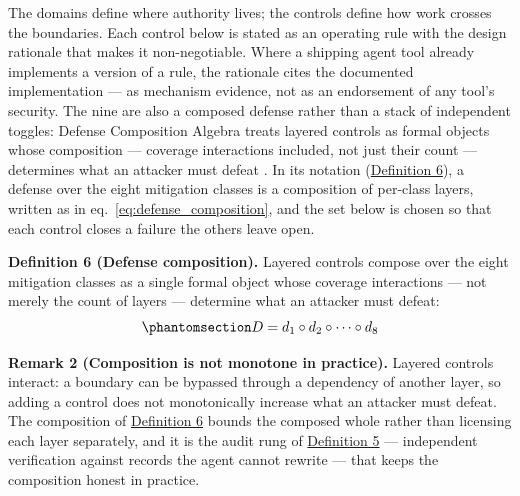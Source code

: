 \documentclass[
  english,
  9pt,
]{extarticle}
\begin{document}
The domains define where authority lives; the controls define how work
crosses the boundaries. Each control below is stated as an operating
rule with the design rationale that makes it non-negotiable. Where a
shipping agent tool already implements a version of a rule, the
rationale cites the documented implementation --- as mechanism evidence,
not as an endorsement of any tool's security. The nine are also a
composed defense rather than a stack of independent toggles: Defense
Composition Algebra treats layered controls as formal objects whose
composition --- coverage interactions included, not just their count ---
determines what an attacker must defeat \citep{cif_formal_2026}. In its
notation (\hyperref[def:defense_composition]{Definition 6}), a defense
over the eight mitigation classes is a composition of per-class layers,
written as in eq.~\ref{eq:defense_composition}, and the set below is
chosen so that each control closes a failure the others leave open.

\protect{}\label{def:defense_composition}
\textbf{Definition 6 (Defense composition).} Layered controls compose
over the eight mitigation classes as a single formal object whose
coverage interactions --- not merely the count of layers --- determine
what an attacker must defeat:
\begin{equation}\protect\phantomsection\label{eq:defense_composition}{D = d_1 \circ d_2 \circ \cdots \circ d_8}\end{equation}

\protect{}\label{rem:composition_interaction}
\textbf{Remark 2 (Composition is not monotone in practice).} Layered
controls interact: a boundary can be bypassed through a dependency of
another layer, so adding a control does not monotonically increase what
an attacker must defeat. The composition of
\hyperref[def:defense_composition]{Definition 6} bounds the composed
whole rather than licensing each layer separately, and it is the audit
rung of \hyperref[def:authority_ladder_order]{Definition 5} ---
independent verification against records the agent cannot rewrite ---
that keeps the composition honest in practice.
\end{document}
